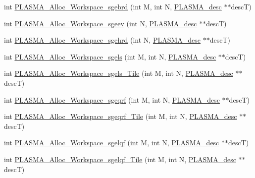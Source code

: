\begin{DoxyCompactItemize}
\item 
int \hyperlink{group__Auxiliary_gae69a9c84a9d822934f85e57d10dbe41f_gae69a9c84a9d822934f85e57d10dbe41f}{P\+L\+A\+S\+M\+A\+\_\+\+Alloc\+\_\+\+Workspace\+\_\+sgebrd} (int M, int N, \hyperlink{structplasma__desc__t}{P\+L\+A\+S\+M\+A\+\_\+desc} $\ast$$\ast$desc\+T)
\item 
int \hyperlink{group__Auxiliary_ga9c7a7f133831cc6350098aaaab05be1a_ga9c7a7f133831cc6350098aaaab05be1a}{P\+L\+A\+S\+M\+A\+\_\+\+Alloc\+\_\+\+Workspace\+\_\+sgeev} (int N, \hyperlink{structplasma__desc__t}{P\+L\+A\+S\+M\+A\+\_\+desc} $\ast$$\ast$desc\+T)
\item 
int \hyperlink{group__Auxiliary_gafc35547eb0ad88de964add1f96a0a53a_gafc35547eb0ad88de964add1f96a0a53a}{P\+L\+A\+S\+M\+A\+\_\+\+Alloc\+\_\+\+Workspace\+\_\+sgehrd} (int N, \hyperlink{structplasma__desc__t}{P\+L\+A\+S\+M\+A\+\_\+desc} $\ast$$\ast$desc\+T)
\item 
int \hyperlink{group__Auxiliary_ga1c2894b5b0f6d22f4cddd6f1a61e7a59_ga1c2894b5b0f6d22f4cddd6f1a61e7a59}{P\+L\+A\+S\+M\+A\+\_\+\+Alloc\+\_\+\+Workspace\+\_\+sgels} (int M, int N, \hyperlink{structplasma__desc__t}{P\+L\+A\+S\+M\+A\+\_\+desc} $\ast$$\ast$desc\+T)
\item 
int \hyperlink{group__Auxiliary_ga1f85f0dff76d605590f52bfdfa831475_ga1f85f0dff76d605590f52bfdfa831475}{P\+L\+A\+S\+M\+A\+\_\+\+Alloc\+\_\+\+Workspace\+\_\+sgels\+\_\+\+Tile} (int M, int N, \hyperlink{structplasma__desc__t}{P\+L\+A\+S\+M\+A\+\_\+desc} $\ast$$\ast$desc\+T)
\item 
int \hyperlink{group__Auxiliary_ga6d28b64a46143d7b4e74ba2bcc4809c4_ga6d28b64a46143d7b4e74ba2bcc4809c4}{P\+L\+A\+S\+M\+A\+\_\+\+Alloc\+\_\+\+Workspace\+\_\+sgeqrf} (int M, int N, \hyperlink{structplasma__desc__t}{P\+L\+A\+S\+M\+A\+\_\+desc} $\ast$$\ast$desc\+T)
\item 
int \hyperlink{group__Auxiliary_ga0fb742599bfd159f7661e8d050e06401_ga0fb742599bfd159f7661e8d050e06401}{P\+L\+A\+S\+M\+A\+\_\+\+Alloc\+\_\+\+Workspace\+\_\+sgeqrf\+\_\+\+Tile} (int M, int N, \hyperlink{structplasma__desc__t}{P\+L\+A\+S\+M\+A\+\_\+desc} $\ast$$\ast$desc\+T)
\item 
int \hyperlink{group__Auxiliary_ga6b9cb8583414a2ac35e7b5908c23239c_ga6b9cb8583414a2ac35e7b5908c23239c}{P\+L\+A\+S\+M\+A\+\_\+\+Alloc\+\_\+\+Workspace\+\_\+sgelqf} (int M, int N, \hyperlink{structplasma__desc__t}{P\+L\+A\+S\+M\+A\+\_\+desc} $\ast$$\ast$desc\+T)
\item 
int \hyperlink{group__Auxiliary_gabd0841a58db4bfe1fec719e919e1b25a_gabd0841a58db4bfe1fec719e919e1b25a}{P\+L\+A\+S\+M\+A\+\_\+\+Alloc\+\_\+\+Workspace\+\_\+sgelqf\+\_\+\+Tile} (int M, int N, \hyperlink{structplasma__desc__t}{P\+L\+A\+S\+M\+A\+\_\+desc} $\ast$$\ast$desc\+T)
$$
\end{DoxyCompactItemize}
